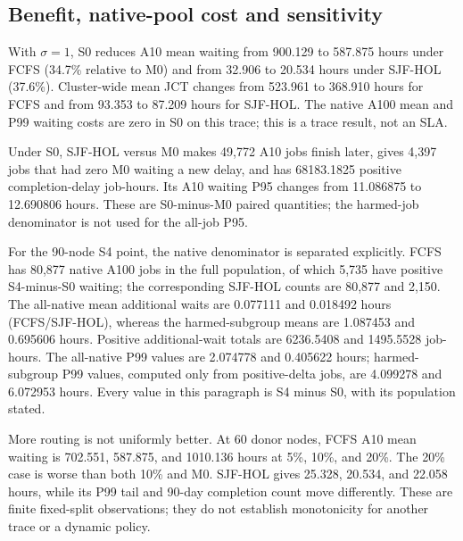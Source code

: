 \begin{table}[!ht]
\centering
\caption{All fourteen formal schedules: waiting, tail and native-harm rows from the r4 paper-ready metrics.}
\label{tab:q3_wait}
\normalsize

\end{table}

\begin{table}[!ht]
\centering
\caption{The same fourteen schedules: JCT and 90-day completion counts. Waiting and JCT use complete drain; completion counts use the 90-day window.}
\label{tab:q3_completion}
\normalsize

\end{table}

\subsection{Benefit, native-pool cost and sensitivity}
With $\sigma=1$, S0 reduces A10 mean waiting from 900.129 to 587.875 hours under FCFS (34.7\% relative to M0) and from 32.906 to 20.534 hours under SJF-HOL (37.6\%). Cluster-wide mean JCT changes from 523.961 to 368.910 hours for FCFS and from 93.353 to 87.209 hours for SJF-HOL. The native A100 mean and P99 waiting costs are zero in S0 on this trace; this is a trace result, not an SLA.

Under S0, SJF-HOL versus M0 makes 49,772 A10 jobs finish later, gives 4,397 jobs that had zero M0 waiting a new delay, and has 68183.1825 positive completion-delay job-hours. Its A10 waiting P95 changes from 11.086875 to 12.690806 hours. These are S0-minus-M0 paired quantities; the harmed-job denominator is not used for the all-job P95.

For the 90-node S4 point, the native denominator is separated explicitly. FCFS has 80,877 native A100 jobs in the full population, of which 5,735 have positive S4-minus-S0 waiting; the corresponding SJF-HOL counts are 80,877 and 2,150. The all-native mean additional waits are 0.077111 and 0.018492 hours (FCFS/SJF-HOL), whereas the harmed-subgroup means are 1.087453 and 0.695606 hours. Positive additional-wait totals are 6236.5408 and 1495.5528 job-hours. The all-native P99 values are 2.074778 and 0.405622 hours; harmed-subgroup P99 values, computed only from positive-delta jobs, are 4.099278 and 6.072953 hours. Every value in this paragraph is S4 minus S0, with its population stated.

More routing is not uniformly better. At 60 donor nodes, FCFS A10 mean waiting is 702.551, 587.875, and 1010.136 hours at 5\%, 10\%, and 20\%. The 20\% case is worse than both 10\% and M0. SJF-HOL gives 25.328, 20.534, and 22.058 hours, while its P99 tail and 90-day completion count move differently. These are finite fixed-split observations; they do not establish monotonicity for another trace or a dynamic policy.

